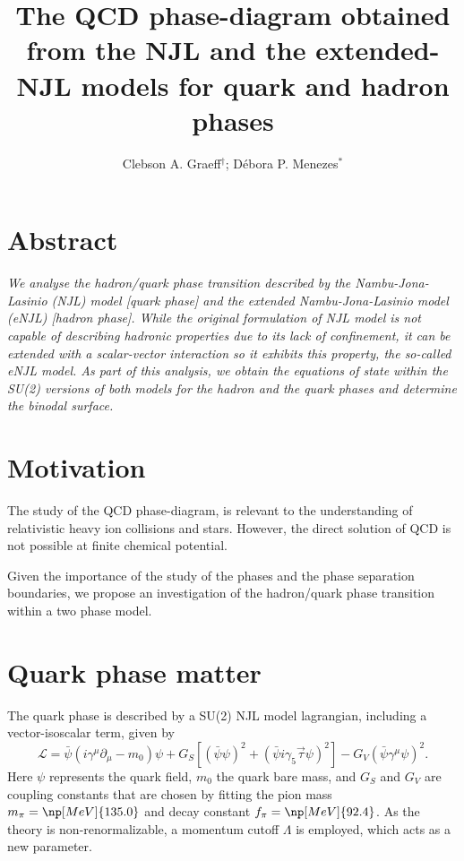 \documentclass[plainsections,alongposter]{sciposterlocal}
\title{The QCD phase-diagram obtained from the NJL and the extended-NJL models for quark and hadron phases}
\author{Clebson A. Graeff$^\dagger$; Débora P. Menezes$^*$}
\institute{$^\dagger$~Universidade Tecnológica Federal do Paraná -- Pato Branco, PR - Brazil \\
$^*$~Universidade Federal de Santa Catarina -- Florian\'opolis, SC - Brazil \\
}
\begin{document}
\maketitle %

\begin{multicols}{2} %

\section*{Abstract}
{ \it
We analyse the hadron/quark phase transition described by the Nambu-Jona-Lasinio (NJL) model [quark phase] and the extended Nambu-Jona-Lasinio model (eNJL) [hadron phase]. While the original formulation of NJL model is not capable of describing hadronic properties due to its lack of confinement, it can be extended with a scalar-vector interaction so it exhibits this property, the so-called  eNJL model. As part of this analysis, we obtain the equations of state within the SU(2) versions of both models for the hadron and the quark phases and determine the binodal surface. 
}

\section*{Motivation}

The study of the QCD phase-diagram, is relevant to the understanding of relativistic heavy ion collisions and stars. However, the direct solution of QCD is not possible at finite chemical potential.

Given the importance of the study of the phases and the phase separation boundaries, we propose an investigation of the hadron/quark phase transition within a two phase model.


 
\section*{Quark phase matter}

The quark phase is described by a SU(2) NJL model lagrangian, including a vector-isoscalar term, given by\cite{Buballa2005}
\begin{equation*}\label{Eq:LagNJL-SU2-Bub}
	\mathcal{L} =\bar{\psi}(i\gamma^\mu\partial_\mu - m_0)\psi + G_S[(\bar{\psi}\psi)^2 + (\bar{\psi}i\gamma_5\vec{\tau}\psi)^2] - G_V(\bar{\psi}\gamma^\mu \psi)^2.
\end{equation*}
%
Here $\psi$ represents the quark field, $m_0$ the quark bare mass, and $G_S$ and $G_V$ are coupling constants that are chosen by fitting the pion mass $m_\pi = \np[MeV]{135.0}$ and decay constant $f_\pi = \np[MeV]{92.4}$. As the theory is non-renormalizable, a momentum cutoff $\Lambda$ is employed, which acts as a new parameter.


\end{multicols}
\end{document}

